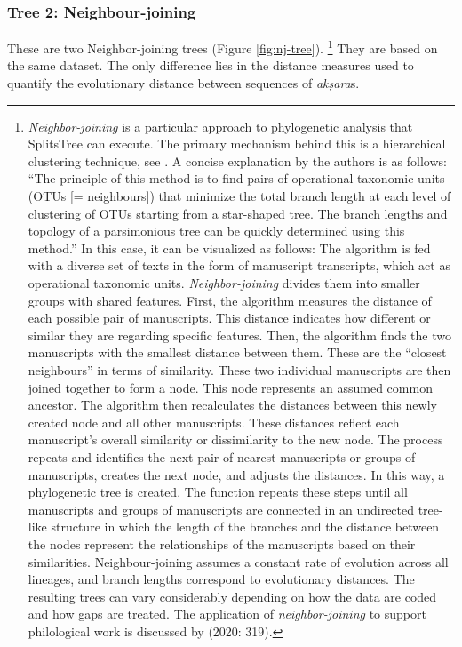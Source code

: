 \subsubsection{Tree 2: Neighbour-joining} 

These are two Neighbor-joining trees (Figure \ref{fig:nj-tree}). \footnote{\textit{Neighbor-joining} is a particular approach to phylogenetic analysis that SplitsTree can execute. The primary mechanism behind this is a hierarchical clustering technique, see \citeauthor[1987]{nei1987}. A concise explanation by the authors is as follows: ``The principle of this method is to find pairs of operational taxonomic units (OTUs [= neighbours]) that minimize the total branch length at each level of clustering of OTUs starting from a star-shaped tree. The branch lengths and topology of a parsimonious tree can be quickly determined using this method.'' In this case, it can be visualized as follows: The algorithm is fed with a diverse set of texts in the form of manuscript transcripts, which act as operational taxonomic units. \textit{Neighbor-joining} divides them into smaller groups with shared features.
First, the algorithm measures the distance of each possible pair of manuscripts. This distance indicates how different or similar they are regarding specific features. Then, the algorithm finds the two manuscripts with the smallest distance between them. These are the ``closest neighbours'' in terms of similarity. These two individual manuscripts are then joined together to form a node. This node represents an assumed common ancestor. The algorithm then recalculates the distances between this newly created node and all other manuscripts. These distances reflect each manuscript's overall similarity or dissimilarity to the new node. The process repeats and identifies the next pair of nearest manuscripts or groups of manuscripts, creates the next node, and adjusts the distances. In this way, a phylogenetic tree is created. The function repeats these steps until all manuscripts and groups of manuscripts are connected in an undirected tree-like structure in which the length of the branches and the distance between the nodes represent the relationships of the manuscripts based on their similarities. Neighbour-joining assumes a constant rate of evolution across all lineages, and branch lengths correspond to evolutionary distances. The resulting trees can vary considerably depending on how the data are coded and how gaps are treated. The application of \textit{neighbor-joining} to support philological work is discussed by \citeauthor{stemmamethods} (2020: 319).} They are based on the same dataset. The only difference lies in the distance measures used to quantify the evolutionary distance between sequences of \textit{akṣara}s.

